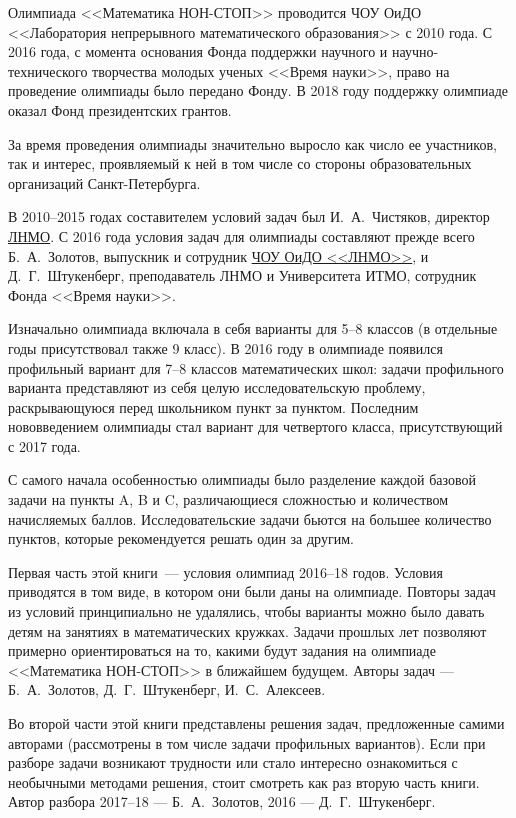 \noindent\abz Олимпиада <<Математика НОН-СТОП>> проводится \hypertarget{lcme}{ЧОУ ОиДО <<Лаборатория непрерывного математического образования>>} с 2010 года. С 2016 года, с момента основания Фонда поддержки научного и научно-технического творчества молодых ученых <<Время науки>>, право на проведение олимпиады было передано Фонду. В 2018 году поддержку олимпиаде оказал Фонд президентских грантов. 

\aabz За время проведения олимпиады значительно выросло как число ее участников, так и интерес, проявляемый к ней в том числе со стороны образовательных организаций Санкт-Петербурга.

\aabz В 2010--2015 годах составителем условий задач был И.~А.~Чистяков, директор \hyperlink{lcme}{ЛНМО}. С 2016 года условия задач для олимпиады составляют прежде всего Б.~А.~Золотов, выпускник и сотрудник \hyperlink{lcme}{ЧОУ ОиДО <<ЛНМО>>}, и Д.~Г.~Штукенберг, преподаватель ЛНМО и Университета ИТМО, сотрудник Фонда <<Время науки>>.

\aabz Изначально олимпиада включала в себя варианты для 5--8 классов (в отдельные годы присутствовал также 9 класс). В 2016 году в олимпиаде появился профильный вариант для 7--8 классов математических школ: задачи профильного варианта представляют из себя целую исследовательскую проблему, раскрывающуюся перед школьником пункт за пунктом.  Последним нововведением олимпиады стал вариант для четвертого класса, присутствующий с 2017 года.

\aabz С самого начала особенностью олимпиады было разделение каждой базовой задачи на пункты A, B и C, различающиеся сложностью и количеством начисляемых баллов. Исследовательские задачи бьются на большее количество пунктов, которые рекомендуется решать один за другим.

\aabz Первая часть этой книги~--- условия олимпиад 2016--18 годов. Условия приводятся в том виде, в котором они были даны на олимпиаде. 
Повторы задач из условий принципиально не удалялись, чтобы варианты можно было давать детям на занятиях в математических кружках. Задачи прошлых лет позволяют примерно ориентироваться на то, какими будут задания на олимпиаде <<Математика НОН-СТОП>> в ближайшем будущем. Авторы задач — Б.~А.~Золотов, Д.~Г.~Штукенберг, И.~С.~Алексеев.

\aabz Во второй части этой книги представлены решения задач, предложенные самими авторами (рассмотрены в том числе задачи профильных вариантов). Если при разборе задачи возникают трудности или стало интересно ознакомиться с необычными методами решения, стоит смотреть как раз вторую часть книги. Автор разбора 2017–18 — Б.~А.~Золотов, 2016 — Д.~Г.~Штукенберг.

